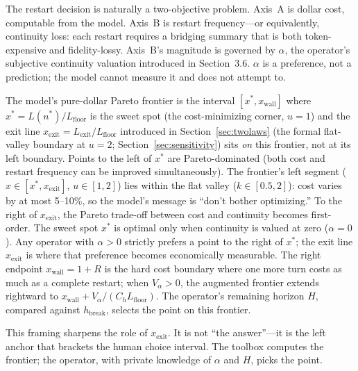 \documentclass[11pt]{article}
\theoremstyle{definition}
\theoremstyle{remark}
\begin{document}
The restart decision is naturally a two-objective problem. Axis~A is dollar cost, computable from the model. Axis~B is restart frequency---or equivalently, continuity loss: each restart requires a bridging summary that is both token-expensive and fidelity-lossy. Axis~B's magnitude is governed by $\alpha$, the operator's subjective continuity valuation introduced in Section~3.6. $\alpha$ is a preference, not a prediction; the model cannot measure it and does not attempt to.

The model's pure-dollar Pareto frontier is the interval $[x^*, x_{\text{wall}}]$ where $x^* = L(n^*)/L_{\text{floor}}$ is the sweet spot (the cost-minimizing corner, $u=1$) and the exit line $x_{\text{exit}} = L_{\text{exit}}/L_{\text{floor}}$ introduced in Section~\ref{sec:twolaws} (the formal flat-valley boundary at $u=2$; Section~\ref{sec:sensitivity}) sits \emph{on} this frontier, not at its left boundary. Points to the left of $x^*$ are Pareto-dominated (both cost and restart frequency can be improved simultaneously). The frontier's left segment ($x \in [x^*, x_{\text{exit}}]$, $u \in [1, 2]$) lies within the flat valley ($k \in [0.5, 2]$): cost varies by at most 5--10\%, so the model's message is ``don't bother optimizing.'' To the right of $x_{\text{exit}}$, the Pareto trade-off between cost and continuity becomes first-order. The sweet spot $x^*$ is optimal only when continuity is valued at zero ($\alpha = 0$). Any operator with $\alpha > 0$ strictly prefers a point to the right of $x^*$; the exit line $x_{\text{exit}}$ is where that preference becomes economically measurable. The right endpoint $x_{\text{wall}} = 1+R$ is the hard cost boundary where one more turn costs as much as a complete restart; when $V_\alpha > 0$, the augmented frontier extends rightward to $x_{\text{wall}} + V_\alpha/(C_h L_{\text{floor}})$. The operator's remaining horizon $H$, compared against $h_{\text{break}}$, selects the point on this frontier.

This framing sharpens the role of $x_{\text{exit}}$. It is not ``the answer''---it is the left anchor that brackets the human choice interval. The toolbox computes the frontier; the operator, with private knowledge of $\alpha$ and $H$, picks the point.
\end{document}
